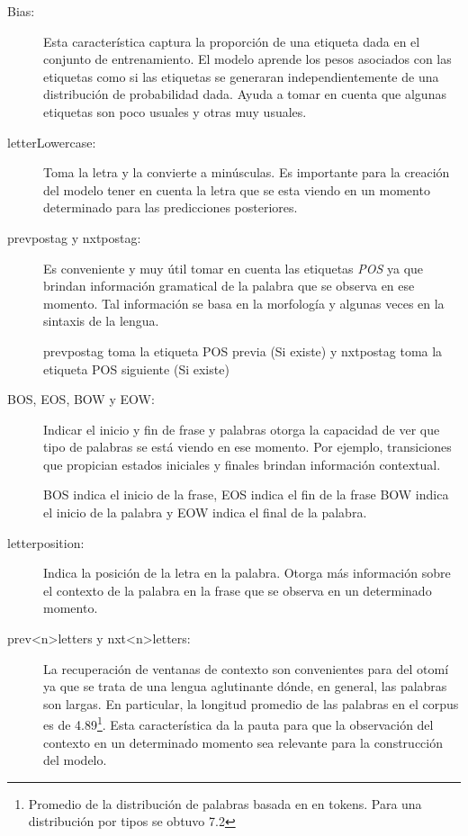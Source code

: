 \documentclass[letterpaper,12pt,oneside]{book}
\theoremstyle{definition}
\begin{document}
\begin{description} \label{feature_functions_descr}
    \item[Bias:] Esta característica captura la proporción de una etiqueta dada en el conjunto de entrenamiento. El modelo aprende los pesos asociados con las etiquetas como si las etiquetas se generaran independientemente de una distribución de probabilidad dada. Ayuda a tomar en cuenta que algunas etiquetas son poco usuales y otras muy usuales.
    
    \item[\textsf{letterLowercase}:] Toma la letra y la convierte a minúsculas. Es importante para la creación del modelo tener en cuenta la letra que se esta viendo en un momento determinado para las predicciones posteriores. 
    
    \item[\textsf{prevpostag} y \textsf{nxtpostag}:] Es conveniente y muy útil tomar en cuenta las etiquetas \textit{POS} ya que brindan información gramatical de la palabra que se observa en ese momento. Tal información se basa en la morfología y algunas veces en la sintaxis de la lengua.

    \textsf{prevpostag} toma la etiqueta POS previa (Si existe) y \textsf{nxtpostag} toma la etiqueta POS siguiente (Si existe)
    
    \item[\textsf{BOS}, \textsf{EOS}, \textsf{BOW} y \textsf{EOW}:] Indicar el inicio y fin de frase y palabras otorga la capacidad de ver que tipo de palabras se está viendo en ese momento. Por ejemplo, transiciones que propician estados iniciales y finales brindan información contextual.

    \textsf{BOS} indica el inicio de la frase, \textsf{EOS} indica el fin de la frase \textsf{BOW} indica el inicio de la palabra y \textsf{EOW} indica el final de la palabra.
    
    \item[\textsf{letterposition}:] Indica la posición de la letra en la palabra. Otorga más información sobre el contexto de la palabra en la frase que se observa en un determinado momento.
    
    \item[\textsf{prev<n>letters} y \textsf{nxt<n>letters}:] La recuperación de ventanas de contexto son convenientes para del otomí ya que se trata de una lengua aglutinante dónde, en general, las palabras son largas. En particular, la longitud promedio de las palabras en el corpus es de 4.89\footnote{Promedio de la distribución de palabras basada en  en tokens. Para una distribución por tipos se obtuvo 7.2}. Esta característica da la pauta para que la observación del contexto en un determinado momento sea relevante para la construcción del modelo.
    

\end{description}
\end{document}
